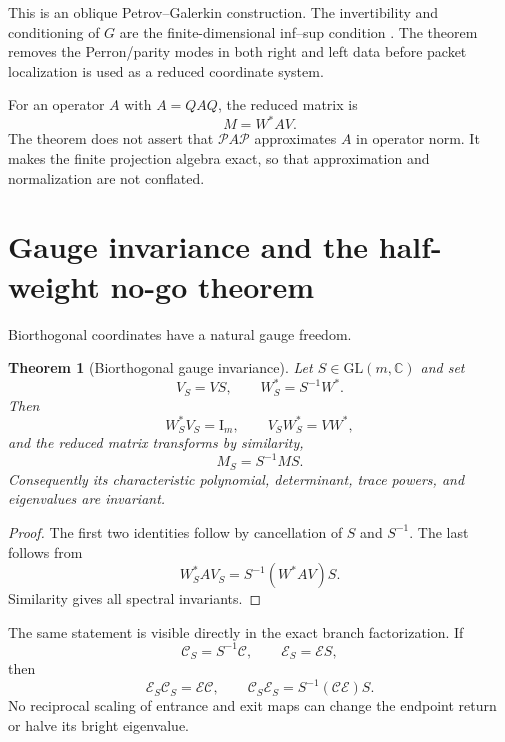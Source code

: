\documentclass[11pt]{article}
\newtheorem{theorem}{Theorem}[section]
\theoremstyle{definition}
\theoremstyle{remark}
\newcommand{\C}{\mathbb C}
\newcommand{\Id}{\mathrm I}
\newcommand{\cC}{\mathcal C}
\newcommand{\cE}{\mathcal E}
\newcommand{\cP}{\mathcal P}
\begin{document}
This is an oblique Petrov--Galerkin construction.  The invertibility and
conditioning of $G$ are the finite-dimensional inf--sup condition
\citep{BoffiBrezziFortin2013,Chatelin1983}.  The theorem removes the
Perron/parity modes in both right and left data before packet localization is
used as a reduced coordinate system.

For an operator $A$ with $A=QAQ$, the reduced matrix is
\begin{equation}\label{eq:reduced-matrix}
 M=W^*AV.
\end{equation}
The theorem does not assert that $\cP A\cP$ approximates $A$ in operator
norm.  It makes the finite projection algebra exact, so that approximation
and normalization are not conflated.

\section{Gauge invariance and the half-weight no-go theorem}
\label{sec:gauge}

Biorthogonal coordinates have a natural gauge freedom.

\begin{theorem}[Biorthogonal gauge invariance]
\label{thm:gauge}
Let $S\in\mathrm{GL}(m,\C)$ and set
\begin{equation}\label{eq:gauge-pair}
 V_S=VS,
 \qquad
 W_S^*=S^{-1}W^*.
\end{equation}
Then
\begin{equation}\label{eq:gauge-duality}
 W_S^*V_S=\Id_m,
 \qquad
 V_SW_S^*=VW^*,
\end{equation}
and the reduced matrix transforms by similarity,
\begin{equation}\label{eq:gauge-similarity}
 \boxed{M_S=S^{-1}MS.}
\end{equation}
Consequently its characteristic polynomial, determinant, trace powers, and
eigenvalues are invariant.
\end{theorem}

\begin{proof}
The first two identities follow by cancellation of $S$ and $S^{-1}$.  The
last follows from
\[
 W_S^*AV_S=S^{-1}(W^*AV)S.
\]
Similarity gives all spectral invariants.
\end{proof}

The same statement is visible directly in the exact branch factorization.
If
\begin{equation}\label{eq:branch-gauge}
 \cC_S=S^{-1}\cC,
 \qquad
 \cE_S=\cE S,
\end{equation}
then
\begin{equation}\label{eq:endpoint-gauge-invariance}
 \cE_S\cC_S=\cE\cC,
 \qquad
 \cC_S\cE_S=S^{-1}(\cC\cE)S.
\end{equation}
No reciprocal scaling of entrance and exit maps can change the endpoint
return or halve its bright eigenvalue.
\end{document}
